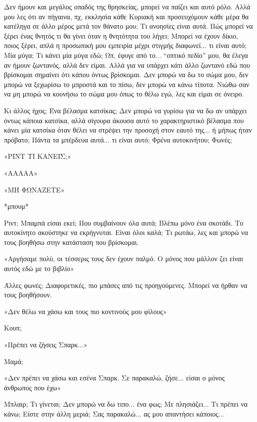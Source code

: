 \documentclass[12pt,twoside, openany]{book}
\begin{document}
Δεν ήμουν και μεγάλος οπαδός της θρησκείας, μπορεί να παίζει και αυτό ρόλο. Αλλά μου λες ότι αν πήγαινα, πχ, εκκλησία κάθε Κυριακή και προσευχόμουν κάθε μέρα θα κατέληγα σε άλλο μέρος μετά τον θάνατο μου; Τι ανοησίες είναι αυτά. Πώς μπορεί να ξέρει ένας θνητός τι θα γίνει όταν η θνητότητα του λήγει; Μπορεί να έχουν δίκιο, ποιος ξέρει, απλά η προσωπική μου εμπειρία μέχρι στιγμής διαφωνεί... τι είναι αυτό; Μία μύγα; Τι κάνει μία μύγα εδώ; Ωπ, έφυγε από το... “οπτικό πεδίο” μου, θα έλεγα αν ήμουν ζωντανός, αλλά δεν είμαι. Αλλά για να υπάρχει κάτι άλλο ζωντανό εδώ που βρίσκομαι σημαίνει ότι κάπου όντως βρίσκομαι. Δεν μπορώ να δω το σώμα μου, δεν μπορώ να ξεχωρίσω το μπροστά και το πίσω, δεν μπορώ να κάνω τίποτα. Νιώθω σαν να μη μπορώ να κουνήσω το σώμα μου όπως το θέλω εγώ, λες και είμαι σε όνειρο.

Κι άλλος ήχος; Ένα βέλασμα κατσίκας; Δεν μπορώ να γυρίσω για να δω αν υπάρχει όντως κάποια κατσίκα, αλλά σίγουρα άκουσα αυτό το χαρακτηριστικό βέλασμα που κάνει μία κατσίκα όταν θέλει να στρέψει την προσοχή στον εαυτό της... ή μήπως ήταν πρόβατο; Πάντα τα μπέρδευα αυτά... τι είναι αυτό; Φρένα αυτοκινήτου; Φωνές;

«ΡΙΝΤ ΤΙ ΚΑΝΕΙΣ;»

«ΑΑΑΑΑ»

«ΜΗ ΦΩΝΑΖΕΤΕ»

*μπουμ*

Ριντ; Μπαμπά είσαι εκεί; Που συμβαίνουν όλα αυτά; Βλέπω μόνο ένα σκοτάδι. Το αυτοκίνητο ακούστηκε να εκρήγνυται. Είναι όλοι καλά; Τι ρωτάω, λες και μπορώ να τους βοηθήσω στην κατάσταση που βρίσκομαι.

«Αργήσαμε πολύ, οι τέσσερις τους δεν έχουν παλμό. Ο μόνος που μάλλον ζει είναι αυτός εδώ με το βιβλίο»

Άλλες φωνές; Διαφορετικές, πιο μπάσες από τις προηγούμενες. Μπορεί να ήρθαν να τους βοηθήσουν.

«Δεν θέλω να χάσω και τους πιο κοντινούς μου φίλους»

Κουπ;

«Πρέπει να ζήσεις Σπαρκ...»

Μαμά;

«Δεν πρέπει να χάσω και εσένα Σπαρκ. Σε παρακαλώ, ζήσε... είσαι ο μόνος άνθρωπος που έχω»

Μπλαιρ; Τι γίνεται; Δεν μπορώ να δω τιπο... ένα φως; Με πλησιάζει... Τι πρέπει να κάνω; Είστε στην άλλη μεριά; Σας παρακαλώ... ας μου απαντήσει κάποιος...

\chapter{}
\end{document}
